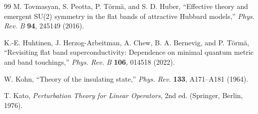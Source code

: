 \documentclass[11pt]{article}
\theoremstyle{remark}
\begin{document}
\begin{thebibliography}{99}
M. Tovmasyan, S. Peotta, P. T\"orm\"a, and S. D. Huber,
``Effective theory and emergent SU(2) symmetry in the flat bands of attractive Hubbard models,''
\emph{Phys. Rev. B} \textbf{94}, 245149 (2016).

K.-E. Huhtinen, J. Herzog-Arbeitman, A. Chew, B. A. Bernevig, and P. T\"orm\"a,
``Revisiting flat band superconductivity: Dependence on minimal quantum metric and band touchings,''
\emph{Phys. Rev. B} \textbf{106}, 014518 (2022).

W. Kohn,
``Theory of the insulating state,''
\emph{Phys. Rev.} \textbf{133}, A171--A181 (1964).

T. Kato, \emph{Perturbation Theory for Linear Operators}, 2nd ed. (Springer, Berlin, 1976).

\end{thebibliography}
\end{document}
